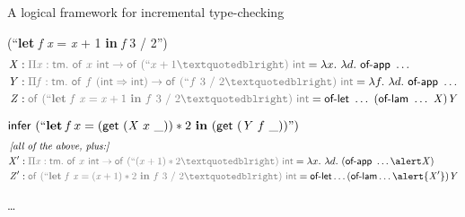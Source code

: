 \documentclass{beamer}
\theoremstyle{example}
\begin{document}
\begin{frame}{A logical framework for incremental type-checking}
  \begin{examples}

    \begin{description}[$\delta_{42} = $]
    \item[$\delta_0 = $]
       (“\textbf{let} \textit{f x} = \textit{x} + 1
      \textbf{in} \textit{f} 3 / 2”)
      \pause
      {\footnotesize
        \begin{align*}
          \mmeta &: \textcolor{gray}{\prd x {\const{tm}} {\const{of}}\ x\ \const{int}
          \to \const{of}\ (\text{“}x+1”)\ \const{int}} = \ulam x \ulam d
          \const{of-app}\ \ldots\\
          \mmmeta &: \textcolor{gray}{\prd f {\const{tm}} \const{of}\ f\
          (\const{int}\To\const{int}) \to \const{of}\ (\text{“}f\ 3\ /\ 2”)\
          \const{int}} = \ulam f \ulam d \const{of-app}\ \ldots\\
          \mmmmeta &: \textcolor{gray}{\const{of}\ (\text{“}\mathbf{let}\ \var f\ \var x = \var
          x + 1\ \mathbf{in}\ f\ 3\ /\ 2”)\ \const{int}} =
          \const{of-let}\ \ldots\ (\const{of-lam}\ \ldots\ \mmeta) \mmmeta
        \end{align*}}
      \pause
  \item[$\delta_1 = $]
    $
    \text{\textsf{infer}}\ (\text{“}\mathbf{let}\, f\, x = (\text{\textsf{get}}\
    (\text{\textit{X}}\ x\ \_)) * 2\
    \mathbf{in}\ (\text{\textsf{get}}\ (\text{\textit{Y}}\ f\ \_))\text{”})
    $
    \pause
    {\footnotesize
      \begin{align*}
        & \hspace{-1em}\text{\it [all of the above, plus:]} \\
        \mmeta' &: \textcolor{gray}{\prd x {\const{tm}} {\const{of}}\ x\ \const{int}
        \to \const{of}\ (\text{“}(x+1)*2”)\ \const{int}} = \ulam x \ulam d
        (\const{of-app}\ \ldots \alert\mmeta)\\
        \mmmmeta' &: \textcolor{gray}{\const{of}\ (\text{“}\mathbf{let}\ \var f\ \var x =
        (\var x + 1) * 2\ \mathbf{in}\ f\ 3\ /\ 2”)\ \const{int}} =
        \const{of-let}\ldots(\const{of-lam}\ldots\alert{\mmeta'}) \mmmeta
      \end{align*}
    }
    \pause
  \item[$\delta_2 =$] \ldots
    \end{description}
  \end{examples}
\end{frame}
\end{document}
